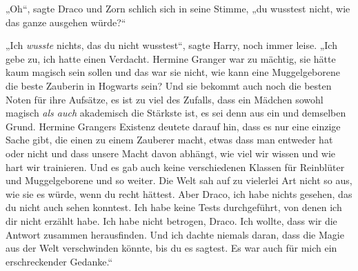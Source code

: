 „Oh“, sagte Draco und Zorn schlich sich in seine Stimme, „du wusstest nicht, wie das ganze ausgehen würde?“

„Ich \emph{wusste} nichts, das du nicht wusstest“, sagte Harry, noch immer leise. „Ich gebe zu, ich hatte einen Verdacht. Hermine Granger war zu mächtig, sie hätte kaum magisch sein sollen und das war sie nicht, wie kann eine Muggelgeborene die beste Zauberin in Hogwarts sein? Und sie bekommt auch noch die besten Noten für ihre Aufsätze, es ist zu viel des Zufalls, dass ein Mädchen sowohl magisch \emph{als auch} akademisch die Stärkste ist, es sei denn aus ein und demselben Grund. Hermine Grangers Existenz deutete darauf hin, dass es nur eine einzige Sache gibt, die einen zu einem Zauberer macht, etwas dass man entweder hat oder nicht und dass unsere Macht davon abhängt, wie viel wir wissen und wie hart wir trainieren. Und es gab auch keine verschiedenen Klassen für Reinblüter und Muggelgeborene und so weiter. Die Welt sah auf zu vielerlei Art nicht so aus, wie sie es würde, wenn du recht hättest. Aber Draco, ich habe nichts gesehen, das du nicht auch sehen konntest. Ich habe keine Tests durchgeführt, von denen ich dir nicht erzählt habe. Ich habe nicht betrogen, Draco. Ich wollte, dass wir die Antwort zusammen herausfinden. Und ich dachte niemals daran, dass die Magie aus der Welt verschwinden könnte, bis du es sagtest. Es war auch für mich ein erschreckender Gedanke.“

